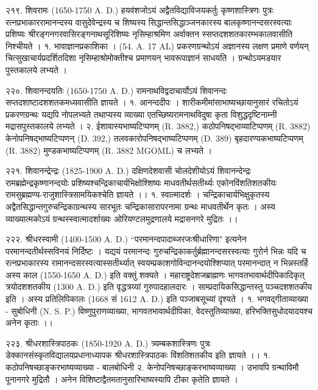२१९. शिवरामः (1650-1750 A. D.)
हयवंशजोऽयं अद्वैतविद्याविजयकर्तुः कृष्णशास्त्रिणः पुत्रः रत्नप्रभाकाररामानन्दस्य वासुदेवेन्द्रस्य च शिष्यस्य सिद्धान्तसिद्धाञ्जनकारस्य बालकृष्णानन्दसरस्वत्याः प्रशिष्यः श्रीरङ्गनगरवासिरङ्गनाथसूरिशिष्यः नृसिम्हाश्रमिण अर्वाक्तन स्सप्तदशशतकारम्भकालवासीति निश्चीयते ।
१. भावाज्ञानप्रकाशिका । (54. A. 17 AL) प्रकरणग्रन्थोऽयं अज्ञानस्य लक्षण प्रमाणे वर्णयन् चित्सुखाचार्यप्रदर्शितदिशा नृसिम्हाश्रोमोक्तीश्च प्रमाणयन् भावरूपाज्ञानं साधयति । ग्रन्थोऽयमडयार पुस्तकालये लभ्यते ।

२२०. शिवानन्दयतिः (1650-1750 A. D.)
रामनाथविद्वदाचार्योऽयं शिवानन्दः सप्तदशाष्टादशशतकमध्यवासीति ज्ञायते । 
१. आनन्ददीपः । शारीकमीमांसाभाष्यच्छायानुसारं रचितोऽयं प्रकरणग्रन्थः यद्यपि नोपलभ्यते तथाप्यस्य व्याख्या एतच्छिष्यरामनाथविदुषा कृता विशुद्धदृष्टिनाम्नी मद्रासपुस्तकालये लभ्यते ।
२. ईशावास्यभाष्यटिप्पणम् (R. 3882,) कठोपनिषद्भाव्याटिप्पणम् (R. 3882) केनोपनिषद्भाष्यटिप्पणन् (D. 392,) तलवकारोपनिषद्भाष्यटिप्पणम् (D. 389) बृहदारण्यकभाष्यटिप्पणम् (R. 3882) मुण्डकभाष्यटिप्पणम् (R. 3882 MGOML) च लभ्यते ।

२२१. शिवानन्द्रेन्द्रः (1825-1900 A. D.)
दक्षिणदेशवासी चोलदेशीयोऽयं शिवानन्देन्द्रः रामब्रह्मेन्द्रकृष्णानन्दयोः प्रशिष्यश्चन्द्रिकाचार्यभिक्षोश्शिष्यः माधवतीर्थसतीर्थ्यः एकोनविंशतिशतकीयः रामसुब्रह्मण्य-राजुशास्त्रिसामयिकश्चेति ज्ञायते ।।
१. स्वात्मादर्शः । चन्द्रिकाचार्यभिक्षुकृतस्य अद्वैतसिद्धान्तगुरुचन्द्रिकाग्रन्थस्य सारभूतः चन्द्रिकासारापरनामा ग्रन्थः माधवतीर्थेन कृतः । अस्य व्याख्यात्मकोऽयं ग्रन्थस्स्वात्मादर्शाख्यः ओरियण्टलमुद्रणालये मद्रासनगरे मुद्रितः ।।

२२२. श्रीधरस्वामी (1400-1500 A. D.)
``परमानन्दपादाब्जरजःश्रीधारिणा" इत्यनेन परमानन्दतीर्थस्सविनयं निर्दिष्टः । यद्ययं परमानन्दः गुरुचन्द्रिकाकर्तुर्ब्रह्मानन्दसरस्वत्याः गुरोर्न भिन्नः यदि च रत्नप्रभाकारस्य रामानन्दसरस्वत्यास्सतीर्थ्यात् स्वयम्प्रकाशगोविन्दानन्दयोश्शिप्यात् परमानन्दात् न भिन्नस्तर्हि अस्य काल (1550-1650 A. D.) इति वक्तुं शक्यते । महाराष्ट्रदेशजब्राह्मणः भागवतभावार्थदीपिकादिकृत् त्रयोदशशतकीय (1300 A. D.) इति वृद्धत्रय्यां गुरुपादहालदारः । साम्प्रदायिकसिद्धान्तस्तु पञ्चदशशतकीय इति । अस्य प्रतिलिपिकालः (1668 सं 1612 A. D.) इति पञ्जाबसूच्यां दृश्यते ।
१. भगवद्गीताव्याख्या - सुबोधिनी (N. S. P.)
विष्णुपुराणव्याख्या, भागवतभावार्थदीपिका, वेदस्तुतिव्याख्या, हरिभक्तिसुधोदयादयश्च अनेन कृताः ।।

२२३. श्रीधरशास्त्रिपाठकः (1850-1920 A. D.)
त्र्यम्बकशास्त्रिणः पुत्रः डेक्कानसंस्कृतविद्यालयप्रधानाध्यापक श्रीधरशास्त्रिपाठकः विंशतिशतकीय इति ज्ञायते ।।
१. कठोपनिषच्छाङ्करभाष्यव्याख्या - बालबोधिनी
२. केनोपनिषच्छाङ्करभाष्यव्याख्या ।
उभावपि ग्रन्थाविमौ पूनानगरे मुद्रितौ । अनेन विशिष्टाद्वैतमतानुसारिभाष्यस्यापि टीका कृतेति ज्ञायते ।

